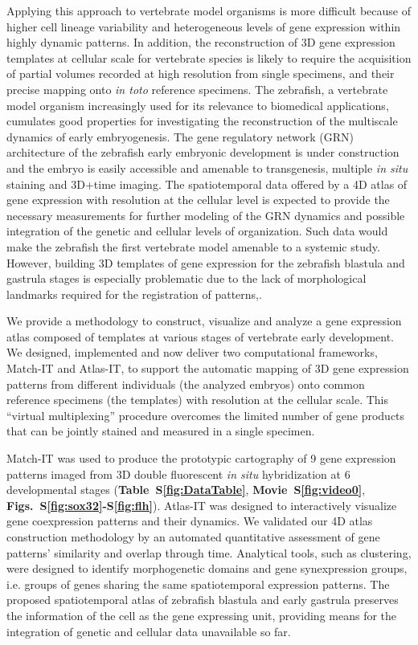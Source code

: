 Applying this approach to vertebrate model organisms is more difficult because of higher cell lineage variability and heterogeneous levels of gene expression within highly dynamic patterns. In addition, the reconstruction of 3D gene expression templates at cellular scale for vertebrate species is likely to require the acquisition of partial volumes recorded at high resolution\cite{peng2011brainaligner} from single specimens, and their precise mapping onto \emph{in toto} reference specimens. The zebrafish, a vertebrate model organism increasingly used for its relevance to biomedical applications\cite{stern2003cancer}, cumulates good properties for investigating the reconstruction of the multiscale dynamics of early embryogenesis. The gene regulatory network (GRN) architecture of the zebrafish early embryonic development is under construction\cite{chan2009developmental} and the embryo is easily accessible and amenable to transgenesis, multiple \emph{in situ} staining and 3D+time imaging. The spatiotemporal data offered by a 4D atlas of gene expression with resolution at the cellular level is expected to provide the necessary measurements for further modeling of the GRN dynamics and possible integration of the genetic and cellular levels of organization\cite{crombach2012efficient}. Such data would make the zebrafish the first vertebrate model amenable to a systemic study. However, building 3D templates of gene expression for the zebrafish blastula and gastrula stages is especially problematic due to the lack of morphological landmarks required for the registration of patterns\cite{fowlkes2011conserved},\cite{ronneberger2012vibe}.

We provide a methodology to construct, visualize and analyze a gene expression atlas composed of templates at various stages of vertebrate early development. We designed, implemented and now deliver two computational frameworks, Match-IT and Atlas-IT, to support the automatic mapping of 3D gene expression patterns from different individuals (the analyzed embryos) onto common reference specimens (the templates) with resolution at the cellular scale. This ``virtual multiplexing'' procedure\cite{fowlkes2008quantitative} overcomes the limited number of gene products that can be jointly stained and measured in a single specimen.

Match-IT was used to produce the prototypic cartography of 9 gene expression patterns imaged from 3D double fluorescent \emph{in situ} hybridization at 6 developmental stages (\textbf{Table~S\ref{fig:DataTable}}, \textbf{Movie~S\ref{fig:video0}}, \textbf{Figs.~S\ref{fig:sox32}-S\ref{fig:flh}}). Atlas-IT was designed to interactively visualize gene coexpression patterns and their dynamics. We validated our 4D atlas construction methodology by an automated quantitative assessment of gene patterns' similarity and overlap through time. Analytical tools, such as clustering, were designed to identify morphogenetic domains and gene synexpression groups, i.e. groups of genes sharing the same spatiotemporal expression patterns. The proposed spatiotemporal atlas of zebrafish blastula and early gastrula preserves the information of the cell as the gene expressing unit, providing means for the integration of genetic and cellular data unavailable so far.

